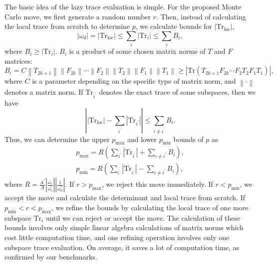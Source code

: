  The basic idea of the lazy trace evaluation is simple. For the proposed Monte Carlo move, we first generate a random number $r$. Then, instead of calculating the local trace from scratch to determine $p$, we calculate bounds for $\left|\text{Tr}_{\text{loc}}\right|$,
\begin{equation}
\left|\omega_{d}\right| = \left|\text{Tr}_{\text{loc}}\right| \leq \sum_{i} \left|\text{Tr}_{i}\right| \leq \sum_{i} B_{i},
\end{equation}
where $B_i \geq \left|\text{Tr}_{i}\right|$. $B_{i}$ is a product of some chosen matrix norms of $T$ and $F$ matrices: 
\begin{equation}
B_i = C  \left\| T_{2k+1} 
\right\| \left\| F_{2k} \right\| \cdots \left\| F_{2} \right\| \left\| T_{2} \right\| 
\left\| F_{1} \right\| \left\| T_{1} \right\| \geq
\left|\text{Tr}(T_{2k+1}F_{2k} \cdots F_{2}T_{2}F_{1}T_{1})\right|,
\end{equation}
where $C$ is a parameter depending on the specific type of matrix norm, and $\left\| \cdot \right\|$ denotes a matrix norm.
If $\text{Tr}_{i^\prime}$ denotes the exact trace of some subspaces, then we have 
\begin{equation}
\left| \left|\text{Tr}_{\text{loc}}\right| - \sum_{i^\prime}\left|\text{Tr}_{i^\prime}\right| \right| 
\leq \sum_{i \neq i^\prime} B_{i}.
\end{equation}
Thus, we can determine the upper $p_{\text{max}}$ and lower $p_{\text{min}}$ bounds of $p$ as
\begin{equation}
\begin{aligned}
p_{\text{max}}=R \left(\sum_{i^\prime}\left|\text{Tr}_{i^\prime}\right| + \sum_{i \neq i^\prime} B_{i}\right),\\
p_{\text{min}}=R \left(\sum_{i^\prime}\left|\text{Tr}_{i^\prime}\right| - \sum_{i \neq i^\prime} B_{i}\right),
\end{aligned}
\end{equation} 
where $R=\frac{A^\prime}{A} \left| \frac{\omega_{c}}{\omega_{c}^{\prime}}\right| \left|\frac{1}{\omega_{d}^{\prime}} \right|$.
If $r>p_{\text{max}}$, we reject this move immediately. If $r<p_{\text{min}}$, we accept the move and calculate the determinant and local trace from scratch. If $ p_{\text{min}} < r < p_{\text{max}} $, we refine the bounds by calculating the local trace of one more subspace $\text{Tr}_{i}$ until we can reject or accept the move. The calculation of these bounds involves only simple linear algebra calculations of matrix norms which cost little computation time, and one refining operation involves only one subspace trace evaluation. On average, it saves a lot of computation time, as confirmed by our benchmarks.

